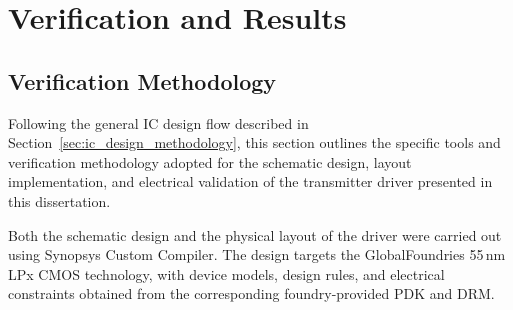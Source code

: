 \chapter{Verification and Results} \label{chap:ch4}

\section{Verification Methodology}\label{sec:verification_methodology}

Following the general \ac{IC} design flow described in Section~\ref{sec:ic_design_methodology}, this section outlines the specific tools and verification methodology adopted for the schematic design, layout implementation, and electrical validation of the transmitter driver presented in this dissertation.

Both the schematic design and the physical layout of the driver were carried out using Synopsys Custom Compiler. The design targets the GlobalFoundries 55\,nm LPx \ac{CMOS} technology, with device models, design rules, and electrical constraints obtained from the corresponding foundry-provided \ac{PDK} and \ac{DRM}.

